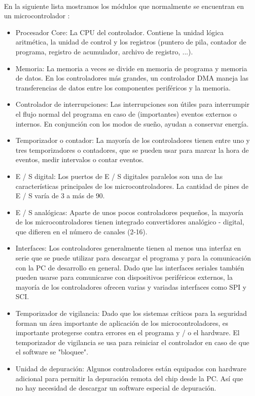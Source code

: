 \paragraph{}
En la siguiente lista mostramos los módulos que normalmente se encuentran en un microcontrolador \citep{MarcoTeoricoMicrocontrolador}:
\begin{itemize}
	\item Procesador Core: La CPU del controlador. Contiene la unidad lógica aritmética, la unidad de control y los registros (puntero de pila, contador de programa, registro de acumulador, archivo de registro, ...).
    \item Memoria: La memoria a veces se divide en memoria de programa y memoria de datos. En los controladores más grandes, un controlador DMA maneja las transferencias de datos entre los componentes periféricos y la memoria.
    \item Controlador de interrupciones: Las interrupciones son útiles para interrumpir el flujo normal del programa en caso de (importantes) eventos externos o internos. En conjunción con los modos de sueño, ayudan a conservar energía.
    \item Temporizador o contador: La mayoría de los controladores tienen entre uno y tres temporizadores o contadores, que se pueden usar para marcar la hora de eventos, medir intervalos o contar eventos.
    \item E / S digital: Los puertos de E / S digitales paralelos son una de las características principales de los microcontroladores. La cantidad de pines de E / S varía de 3 a más de 90.
    \item E / S analógicas: Aparte de unos pocos controladores pequeños, la mayoría de los microcontroladores tienen integrado convertidores analógico - digital, que difieren en el número de canales (2-16). 
    \item Interfaces: Los controladores generalmente tienen al menos una interfaz en serie que se puede utilizar para descargar el programa y para la comunicación con la PC de desarrollo en general. Dado que las interfaces seriales también pueden usarse para comunicarse con dispositivos periféricos externos, la mayoría de los controladores ofrecen varias y variadas interfaces como SPI y SCI.
    \item Temporizador de vigilancia: Dado que los sistemas críticos para la seguridad forman un área importante de aplicación de los microcontroladores, es importante protegerse contra errores en el programa y / o el hardware. El temporizador de vigilancia se usa para reiniciar el controlador en caso de que el software se "bloquee".
    \item Unidad de depuración: Algunos controladores están equipados con hardware adicional para permitir la depuración remota del chip desde la PC. Así que no hay necesidad de descargar un software especial de depuración.
\end{itemize}

